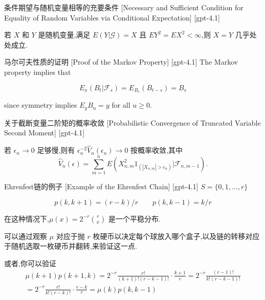 \documentclass[UTF8]{ctexart}
\begin{document}
    \begin{thm}
        {条件期望与随机变量相等的充要条件}
        [Necessary and Sufficient Condition for Equality of Random Variables via Conditional Expectation]
        [gpt-4.1]
        
若 $X$ 和 $Y$ 是随机变量,满足 $E ( Y | \mathcal{G} ) = X$ 且 $E Y^2 = E X^2 < \infty$,则 $X = Y$ 几乎处处成立.

    \end{thm}
    
    
    
    \begin{prf}
        {马尔可夫性质的证明}
        [Proof of the Markov Property]
        [gpt-4.1]
        The Markov property implies that

\[
E_{x}(B_{t} | \mathcal{F}_{s}) = E_{B_{s}}(B_{t-s}) = B_{s}
\]

since symmetry implies $E_{y} B_{u} = y$ for all $u \geq 0$.
    \end{prf}
    
    
    
    \begin{lma}
        {关于截断变量二阶矩的概率收敛}
        [Probabilistic Convergence of Truncated Variable Second Moment]
        [gpt-4.1]
        
若 $\epsilon_n \to 0$ 足够慢,则有 $\epsilon_n^{-2} \hat{V}_n ( \epsilon_n ) \to 0$ 按概率收敛,其中
\[
\hat{V}_n(\epsilon) = \sum_{m=1}^{n} E( X_{n, m}^2 1_{( |X_{n, m}| > \epsilon_n )} | \mathcal{F}_{n, m-1} ) .
\]

    \end{lma}
    
    
    
    \begin{xmp}
        {Ehrenfest链的例子}
        [Example of the Ehrenfest Chain]
        [gpt-4.1]
        $S = \{ 0 , 1 , \ldots , r \}$

\[
p ( k , k + 1 ) = ( r - k ) / r \qquad p ( k , k - 1 ) = k / r
\]

在这种情况下,$\mu ( x ) = 2 ^ { - r } { \binom { r } { x } }$ 是一个平稳分布.

可以通过观察 $\mu$ 对应于抛 $r$ 枚硬币以决定每个球放入哪个盒子,以及链的转移对应于随机选取一枚硬币并翻转,来验证这一点.

或者,你可以验证
\[
\begin{array} { l } 
{ \displaystyle \mu ( k + 1 ) p ( k + 1 , k ) = 2 ^ { - r } \frac { r ! } { ( k + 1 ) ! ( r - k - 1 ) ! } \cdot \frac { k + 1 } { r } = 2 ^ { - r } \frac { ( r - 1 ) ! } { k ! ( r - k - 1 ) ! } } \\ 
{ = 2 ^ { - r } \frac { r ! } { k ! ( r - k ) ! } \cdot \frac { r - k } { r } = \mu ( k ) p ( k , k - 1 ) } 
\end{array}
\]

    \end{xmp}
    
\end{document}
